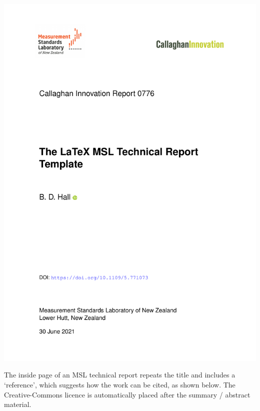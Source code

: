 {\begin{center}
\includegraphics[scale=.5,page=1]{pictures/Report}
\end{center}

\newpage
The inside page of an MSL technical report repeats the title and includes a `reference', which suggests how the work can be cited, as shown below. The Creative-Commons licence is automatically placed after the summary / abstract material. 

}
